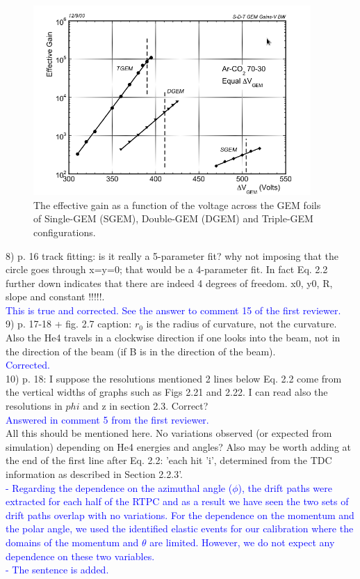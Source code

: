 \begin{figure}[tbp]
\centering
\includegraphics[height=7.2cm]{fig/GEM_gains.png}
\caption{ The effective gain as a function of the voltage across the GEM foils 
of Single-GEM (SGEM), Double-GEM (DGEM) and Triple-GEM configurations.}
\label{fig:gem_gains}
\end{figure}


8) p. 16 track fitting: is it really a 5-parameter fit? why not imposing that the 
circle goes through x=y=0; that would be a 4-parameter fit. In fact Eq. 2.2 
further down indicates that there are indeed 4 degrees of freedom.
    x0, y0, R, slope and constant !!!!!.\\
   \textcolor{blue}{This is true and corrected. See the answer to comment 15 of 
   the first reviewer.}\\

9) p. 17-18 + fig. 2.7 caption: $r_{0}$ is the radius of curvature, not the curvature. 
Also the He4 travels in a clockwise direction if one looks into the beam, not 
in the direction of the beam (if B is in the direction of the beam).\\
\textcolor{blue}{  Corrected.}\\


10) p. 18: I suppose the resolutions mentioned 2 lines below Eq. 2.2 come from the 
vertical widths of graphs such as Figs 2.21 and 2.22. I can read also the 
resolutions in $phi$ and z in section 2.3. Correct?\\
 \textcolor{blue}{ Answered in comment 5 from the first reviewer.  }\\

All this should be mentioned here.  No variations observed (or expected from 
simulation) depending on He4 energies and angles? Also may be worth adding at 
the end of the first line after Eq. 2.2: 'each hit 'i', determined from the TDC 
information as described in Section 2.2.3'.\\
  \textcolor{blue}{
     - Regarding the dependence on the azimuthal 
     angle ($\phi$), the drift paths were extracted for each half of the RTPC 
     and as a result we have seen the two sets of drift paths overlap with no 
     variations. For the dependence on the momentum and the polar angle, we 
     used the identified elastic events for our calibration where the domains 
     of the momentum and $\theta$ are limited. However, we do not expect any 
     dependence on these two variables. \\
  - The sentence is added.}\\
 

